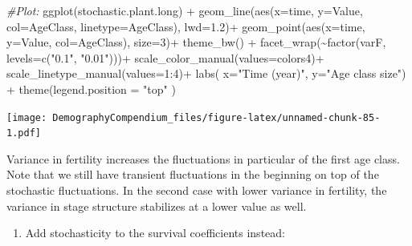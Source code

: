 \documentclass[
]{book}
\newenvironment{Shaded}{\begin{snugshade}}{\end{snugshade}}
\newcommand{\AttributeTok}[1]{\textcolor[rgb]{0.77,0.63,0.00}{#1}}
\newcommand{\CommentTok}[1]{\textcolor[rgb]{0.56,0.35,0.01}{\textit{#1}}}
\newcommand{\DecValTok}[1]{\textcolor[rgb]{0.00,0.00,0.81}{#1}}
\newcommand{\FloatTok}[1]{\textcolor[rgb]{0.00,0.00,0.81}{#1}}
\newcommand{\FunctionTok}[1]{\textcolor[rgb]{0.00,0.00,0.00}{#1}}
\newcommand{\NormalTok}[1]{#1}
\newcommand{\SpecialCharTok}[1]{\textcolor[rgb]{0.00,0.00,0.00}{#1}}
\newcommand{\StringTok}[1]{\textcolor[rgb]{0.31,0.60,0.02}{#1}}
\providecommand{\tightlist}{%
  \setlength{\itemsep}{0pt}\setlength{\parskip}{0pt}}
\begin{document}
\begin{Shaded}
\begin{Highlighting}[]
\CommentTok{\#Plot:}
\FunctionTok{ggplot}\NormalTok{(stochastic.plant.long) }\SpecialCharTok{+} 
  \FunctionTok{geom\_line}\NormalTok{(}\FunctionTok{aes}\NormalTok{(}\AttributeTok{x=}\NormalTok{time, }\AttributeTok{y=}\NormalTok{Value, }\AttributeTok{col=}\NormalTok{AgeClass, }\AttributeTok{linetype=}\NormalTok{AgeClass), }\AttributeTok{lwd=}\FloatTok{1.2}\NormalTok{)}\SpecialCharTok{+}
  \FunctionTok{geom\_point}\NormalTok{(}\FunctionTok{aes}\NormalTok{(}\AttributeTok{x=}\NormalTok{time, }\AttributeTok{y=}\NormalTok{Value, }\AttributeTok{col=}\NormalTok{AgeClass), }\AttributeTok{size=}\DecValTok{3}\NormalTok{)}\SpecialCharTok{+}
  \FunctionTok{theme\_bw}\NormalTok{() }\SpecialCharTok{+}
   \FunctionTok{facet\_wrap}\NormalTok{(}\SpecialCharTok{\textasciitilde{}}\FunctionTok{factor}\NormalTok{(varF, }\AttributeTok{levels=}\FunctionTok{c}\NormalTok{(}\StringTok{"0.1"}\NormalTok{, }\StringTok{"0.01"}\NormalTok{)))}\SpecialCharTok{+}
  \FunctionTok{scale\_color\_manual}\NormalTok{(}\AttributeTok{values=}\NormalTok{colors4)}\SpecialCharTok{+} 
  \FunctionTok{scale\_linetype\_manual}\NormalTok{(}\AttributeTok{values=}\DecValTok{1}\SpecialCharTok{:}\DecValTok{4}\NormalTok{)}\SpecialCharTok{+}  
  \FunctionTok{labs}\NormalTok{( }\AttributeTok{x=}\StringTok{"Time (year)"}\NormalTok{, }\AttributeTok{y=}\StringTok{"Age class size"}\NormalTok{)  }\SpecialCharTok{+}
    \FunctionTok{theme}\NormalTok{(}\AttributeTok{legend.position =} \StringTok{"top"}\NormalTok{ ) }
\end{Highlighting}
\end{Shaded}

\texttt{[image: DemographyCompendium\_files/figure-latex/unnamed-chunk-85-1.pdf]}

Variance in fertility increases the fluctuations in particular of the first age class. Note that we still have transient fluctuations in the beginning on top of the stochastic fluctuations. In the second case with lower variance in fertility, the variance in stage structure stabilizes at a lower value as well.

\begin{enumerate}
\def\labelenumi{\arabic{enumi}.}
\setcounter{enumi}{1}
\tightlist
\item
  Add stochasticity to the survival coefficients instead:
\end{enumerate}
\end{document}
